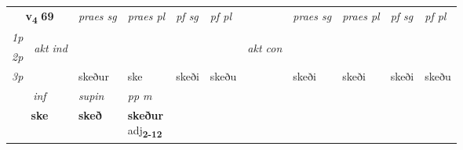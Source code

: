 \noindent
\begin{tabular}{lllllllllll} \toprule
\multicolumn{2}{c}{\textbf{v{\textsubscript{4}}} \Large{\textbf{69}}}  &  \textit{praes sg}  & \textit{praes pl}  &\textit{ pf sg} & \textit{pf pl} &  &  \textit{praes sg}  & \textit{praes pl}  & \textit{pf sg} & \textit{pf pl } \\*
	\cmidrule{3-6} \cmidrule{8-11}
 {\textit{1p}} & \multirow{3}{*}{\begin{turn}{90}\textit{akt ind}\end{turn}} & \textbf{} &  & \textbf{} & \textbf{} & \multirow{3}{*}{\begin{turn}{90}\textit{akt con}\end{turn}} & &  & \textbf{} & \\*
 {\textit{2p}} &  &    &  &  &  & &  &  &  &  \\*
{\textit{3p}} &  & skeður & ske & skeði & skeðu & & skeði & skeði& skeði & skeðu \\*
\cmidrule{3-6} \cmidrule{8-11}

   \multicolumn{2}{c}{\textit{inf}}      & \textit{supin}  & \textit{pp m} \\*
  \multicolumn{2}{c}{\textbf{ske}}       &  \textbf{skeð}  & \specialcell{\textbf{skeður} \\ adj\textbf{\textsubscript{2-12}}} \\*
\end{tabular}

